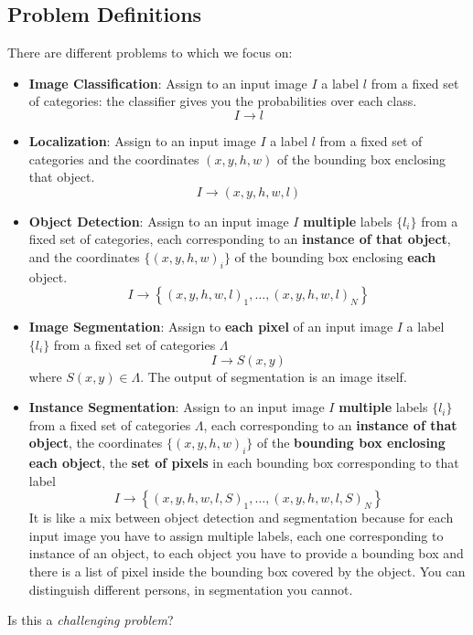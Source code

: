\subsection{Problem Definitions}
There are different problems to which we focus on:
\begin{itemize}
    \item \textbf{Image Classification}: Assign to an input image $I$ a label $l$ from a fixed set of categories: the classifier gives you the probabilities over each class. $$I \rightarrow l$$
    \item \textbf{Localization}: Assign to an input image $I$ a label $l$ from a fixed set of categories and the coordinates $(x, y, h, w)$ of the bounding box enclosing that object. $$I \rightarrow (x, y, h, w,l)$$
    \item \textbf{Object Detection}: Assign to an input image $I$ \textbf{multiple} labels $\{l_i\}$ from a fixed set of categories, each corresponding to an \textbf{instance of that object}, and the coordinates $\{(x, y, h, w)_i\}$ of the bounding box enclosing \textbf{each} object. 
    $$
    I \rightarrow\left\{(x, y, h, w, l)_{1}, \dots,(x, y, h, w, l)_{N}\right\}
    $$
    \item \textbf{Image Segmentation}: Assign to \textbf{each pixel} of an input image $I$ a label $\{l_i\}$ from a fixed set of categories $\Lambda$ $$ I \rightarrow S(x,y)$$ where $S(x,y) \in \Lambda$. The output of segmentation is an image itself.
    \item \textbf{Instance Segmentation}: Assign to an input image $I$ \textbf{multiple} labels $\{l_i\}$ from a fixed set of categories $\Lambda$, each corresponding to an \textbf{instance of that object}, the coordinates $\{(x, y, h, w)_i\}$ of the \textbf{bounding box enclosing each object}, the \textbf{set of pixels} in each bounding box corresponding to that label 
    $$
    I \rightarrow\left\{(x, y, h, w, l,S)_{1}, \dots,(x, y, h, w, l,S)_{N}\right\}
    $$
    It is like a mix between object detection and segmentation because for each input image you have to assign multiple labels, each one corresponding to instance of an object, to each object you have to provide a bounding box and there is a list of pixel inside the bounding box covered by the object. You can distinguish different persons, in segmentation you cannot.

\end{itemize}
Is this a \textit{challenging problem}? 
